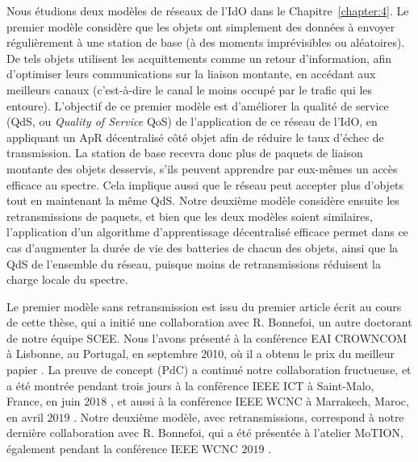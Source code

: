 \begin{resume_fr}
%
Nous étudions deux modèles de réseaux de l'IdO dans le Chapitre~\ref{chapter:4}.
Le premier modèle considère que les objets ont simplement des données à envoyer régulièrement à une station de base (à des moments imprévisibles ou aléatoires).
De tels objets utilisent les acquittements comme un retour d'information, afin d'optimiser leurs communications sur la liaison montante, en accédant aux meilleurs canaux (c'est-à-dire le canal le moins occupé par le trafic qui les entoure).
L'objectif de ce premier modèle est d'améliorer la qualité de service (QdS, ou \emph{Quality of Service} QoS) de l'application de ce réseau de l'IdO, en appliquant un ApR décentralisé côté objet afin de réduire le taux d'échec de transmission.
La station de base recevra donc plus de paquets de liaison montante des objets desservis, s'ils peuvent apprendre par eux-mêmes un accès efficace au spectre.
Cela implique aussi que le réseau peut accepter plus d'objets tout en maintenant la même QdS.
%
Notre deuxième modèle considère ensuite les retransmissions de paquets, et bien que les deux modèles soient similaires, l'application d'un algorithme d'apprentissage décentralisé efficace permet dans ce cas d'augmenter la durée de vie des batteries de chacun des objets, ainsi que la QdS de l'ensemble du réseau, puisque moins de retransmissions réduisent la charge locale du spectre.

Le premier modèle sans retransmission est issu du premier article écrit au cours de cette thèse, qui a initié une collaboration avec R. Bonnefoi, un autre doctorant de notre équipe SCEE.
Nous l'avons présenté à la conférence EAI CROWNCOM à Lisbonne, au Portugal, en septembre 2010, où il a obtenu le \guillemotleft{} prix du meilleur papier \guillemotright{} \cite{Bonnefoi17}.
%
La preuve de concept (PdC) a continué notre collaboration fructueuse, et a été montrée pendant trois jours à la conférence IEEE ICT à Saint-Malo, France, en juin $2018$ \cite{Besson2018ICT}, et aussi à la conférence IEEE WCNC à Marrakech, Maroc, en avril $2019$ \cite{Besson2019WCNC}.
%
Notre deuxième modèle, avec retransmissions, correspond à notre dernière collaboration avec R. Bonnefoi, qui a été présentée à l'atelier MoTION, également pendant la conférence IEEE WCNC $2019$ \cite{Bonnefoi2019WCNC}.



\end{resume_fr}
